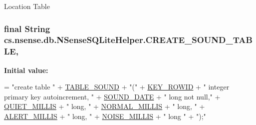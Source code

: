 Location Table \hypertarget{classcs_1_1nsense_1_1db_1_1_n_sense_s_q_lite_helper_a81496624d25ba2f93b08ca60d576cdb7}{
\subsubsection[{C\-R\-E\-A\-T\-E\-\_\-\-S\-O\-U\-N\-D\-\_\-\-T\-A\-B\-L\-E}]{\setlength{\rightskip}{0pt plus 5cm}final String cs.\-nsense.\-db.\-N\-Sense\-S\-Q\-Lite\-Helper.\-C\-R\-E\-A\-T\-E\-\_\-\-S\-O\-U\-N\-D\-\_\-\-T\-A\-B\-L\-E\hspace{0.3cm}{\ttfamily [static]}, {\ttfamily [private]}}}\label{classcs_1_1nsense_1_1db_1_1_n_sense_s_q_lite_helper_a81496624d25ba2f93b08ca60d576cdb7}
{\bfseries Initial value\-:}
\begin{DoxyCode}
= \textcolor{stringliteral}{"create table "}
            + \hyperlink{classcs_1_1nsense_1_1db_1_1_n_sense_s_q_lite_helper_a65318f615866f1180c84e186fa05641a}{TABLE\_SOUND} + \textcolor{stringliteral}{"("}
            + \hyperlink{classcs_1_1nsense_1_1db_1_1_n_sense_s_q_lite_helper_a98ac608a28955ac678219d9eada34781}{KEY\_ROWID} + \textcolor{stringliteral}{" integer primary key autoincrement, "}
            + \hyperlink{classcs_1_1nsense_1_1db_1_1_n_sense_s_q_lite_helper_aa06cac21fc74b8e6402ab0d38b2d6b06}{SOUND\_DATE} + \textcolor{stringliteral}{" long not null,"}
            + \hyperlink{classcs_1_1nsense_1_1db_1_1_n_sense_s_q_lite_helper_aca4c16641d87e464e37b4649a2b643fe}{QUIET\_MILLIS} + \textcolor{stringliteral}{" long, "} 
            + \hyperlink{classcs_1_1nsense_1_1db_1_1_n_sense_s_q_lite_helper_a40a1401dfe12d12ab47792eb901d7783}{NORMAL\_MILLIS} + \textcolor{stringliteral}{" long, "}
            + \hyperlink{classcs_1_1nsense_1_1db_1_1_n_sense_s_q_lite_helper_ab8fbad09e9e02a101ab3ba52048933d3}{ALERT\_MILLIS} + \textcolor{stringliteral}{" long, "}
            + \hyperlink{classcs_1_1nsense_1_1db_1_1_n_sense_s_q_lite_helper_a5c96f0a16dc1dd2bfa9163f1eb409faf}{NOISE\_MILLIS} + \textcolor{stringliteral}{" long "}
            + \textcolor{stringliteral}{");"}
\end{DoxyCode}
